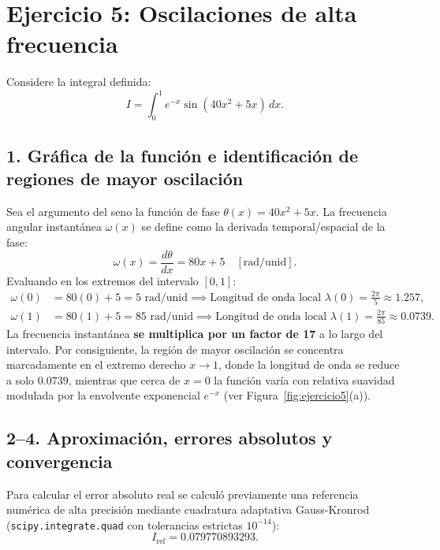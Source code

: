 \documentclass[11pt,a4paper]{article}
\begin{document}
\section{Ejercicio 5: Oscilaciones de alta frecuencia}

Considere la integral definida:
\begin{equation}
    I = \int_0^1 e^{-x} \sin(40x^2 + 5x)\, dx.
\end{equation}

\subsection{1. Gráfica de la función e identificación de regiones de mayor oscilación}
Sea el argumento del seno la función de fase $\theta(x) = 40x^2 + 5x$. La frecuencia angular instantánea $\omega(x)$ se define como la derivada temporal/espacial de la fase:
\begin{equation}
    \omega(x) = \frac{d\theta}{dx} = 80x + 5 \quad [\text{rad/unid}].
\end{equation}
Evaluando en los extremos del intervalo $[0, 1]$:
\begin{align}
    \omega(0) &= 80(0) + 5 = 5 \text{ rad/unid} \implies \text{Longitud de onda local } \lambda(0) = \frac{2\pi}{5} \approx 1.257, \\
    \omega(1) &= 80(1) + 5 = 85 \text{ rad/unid} \implies \text{Longitud de onda local } \lambda(1) = \frac{2\pi}{85} \approx 0.0739.
\end{align}
La frecuencia instantánea \textbf{se multiplica por un factor de 17} a lo largo del intervalo. Por consiguiente, la región de mayor oscilación se concentra marcadamente en el extremo derecho $x \to 1$, donde la longitud de onda se reduce a solo $0.0739$, mientras que cerca de $x=0$ la función varía con relativa suavidad modulada por la envolvente exponencial $e^{-x}$ (ver Figura~\ref{fig:ejercicio5}(a)).

\subsection{2--4. Aproximación, errores absolutos y convergencia}
Para calcular el error absoluto real se calculó previamente una referencia numérica de alta precisión mediante cuadratura adaptativa Gauss-Kronrod (\texttt{scipy.integrate.quad} con tolerancias estrictas $10^{-14}$):
\begin{equation}
    I_{\text{ref}} = \mathbf{0.079770893293}.
\end{equation}
\end{document}
